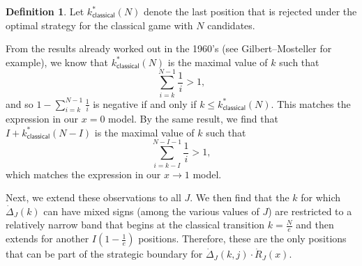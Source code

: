 \documentclass[11pt]{amsart}   %
\theoremstyle{definition}
\newtheorem{definition}[theorem]{Definition}
\theoremstyle{remark}
\numberwithin{equation}{section}
\theoremstyle{theorem}
\begin{document}
\begin{definition}
Let $k^\ast_{\mathsf{classical}}(N)$ denote the last position that is rejected under the optimal strategy for the classical game with $N$ candidates.
\end{definition}

From the results already worked out in the 1960's (see Gilbert--Mosteller \cite{gilbert--mosteller} for example), we know that $k^\ast_{\mathsf{classical}}(N)$ is the maximal value of $k$ such that 
\begin{equation}\label{e:x0}
 \sum_{i=k}^{N-1} \frac{1}{i} > 1, 
\end{equation}
and so $1 - \sum_{i=k}^{N-1} \frac{1}{i}$ is negative if and only if $k \leq k^\ast_{\mathsf{classical}}(N)$.
This matches the expression in our $x = 0$ model.  By the same result, we find
that $I + k^\ast_{\mathsf{classical}}(N-I)$ is the maximal value of $k$ such
that 
\begin{equation}\label{e:x1}
 \sum_{i=k-I}^{N-I-1} \frac{1}{i} > 1, 
\end{equation}
which matches the expression in our $x \rightarrow 1$ model.

Next, we extend these observations to all $J$.  We then find that the $k$ for
which $\dot\Delta_J(k)$ can have mixed signs (among the various values of $J$)
are restricted to a relatively narrow band that begins at the classical
transition $k = \frac{N}{e}$ and then extends for another $I\left(1 -
\frac{1}{e}\right)$ positions.  Therefore, these are the only positions that
can be part of the strategic boundary for $\dot\Delta_J(k,j) \cdot
\dot{R}_J(x)$.
\end{document}
